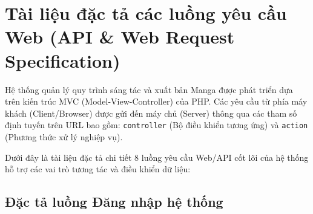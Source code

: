 \chapter{Tài liệu đặc tả các luồng yêu cầu Web (API \& Web Request Specification)}
\label{chap:api_documentation}

Hệ thống quản lý quy trình sáng tác và xuất bản Manga được phát triển dựa trên kiến trúc MVC (Model-View-Controller) của PHP. Các yêu cầu từ phía máy khách (Client/Browser) được gửi đến máy chủ (Server) thông qua các tham số định tuyến trên URL bao gồm: \texttt{\small controller} (Bộ điều khiển tương ứng) và \texttt{\small action} (Phương thức xử lý nghiệp vụ).

Dưới đây là tài liệu đặc tả chi tiết 8 luồng yêu cầu Web/API cốt lõi của hệ thống hỗ trợ các vai trò tương tác và điều khiển dữ liệu:

\section{Đặc tả luồng Đăng nhập hệ thống}
\label{sec:api_auth_login}

